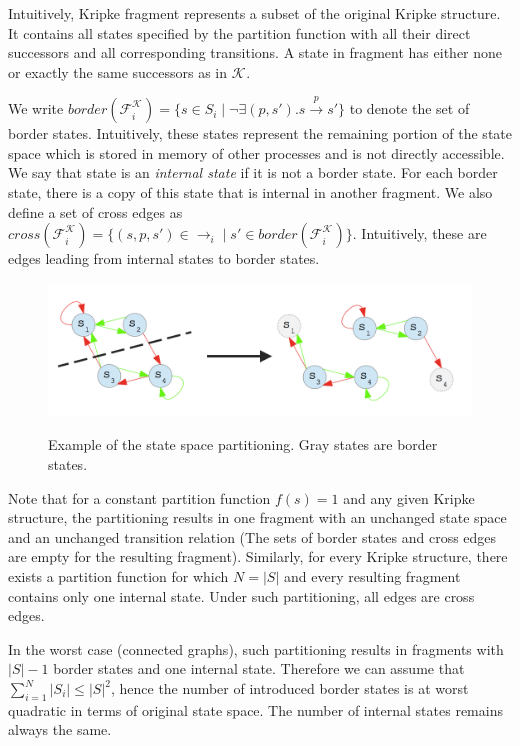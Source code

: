 \documentclass[12pt,oneside]{fithesis2}
\newcommand{\ks}[1][]{\ensuremath{\mathcal{K}_{#1}}}
\newcommand{\kf}[2]{\ensuremath{\mathcal{F}^{#2}_{#1}}}
\newcommand{\trans}[1]{\stackrel{#1}{\rightarrow}}
\begin{document}
			Intuitively, Kripke fragment represents a subset of the original Kripke structure. It contains all states specified by the partition function with all their direct successors and all corresponding transitions. A state in fragment has either none or exactly the same successors as in $\ks$.
			
			We write $border(\kf{i}{\ks}) =  \{ s\in S_i \mid \neg \exists (p,s').s\trans{p}s'\}$ to denote the set of border states. Intuitively, these states represent the remaining portion of the state space which is stored in memory of other processes and is not directly accessible. We say that state is an \emph{internal state} if it is not a border state. For each border state, there is a copy of this state that is internal in another fragment. We also define a set of cross edges as $cross(\kf{i}{\ks}) = \{ (s, p, s') \in \trans{}_{i} \mid s' \in border(\kf{i}{\ks}) \}$. Intuitively, these are edges leading from internal states to border states. 
			
			\begin{figure}
			  \begin{center}
				 \includegraphics[scale=.3]{partition.png}
				\label{fig:genmodel}
				\caption{Example of the state space partitioning. Gray states are border states. }
				\end{center}
			\end{figure}


			Note that for a constant partition function $f(s) = 1$ and any given Kripke structure, the partitioning results in one fragment with an unchanged state space and an unchanged transition relation (The sets of border states and cross edges are empty for the resulting fragment). Similarly, for every Kripke structure, there exists a partition function for which $N = |S|$ and every resulting fragment contains only one internal state. Under such partitioning, all edges are cross edges. 
			
			In the worst case (connected graphs), such partitioning results in fragments with $|S| - 1$ border states and one internal state. Therefore we can assume that $\sum\limits_{i=1}^N | S_i | \leq |S|^2 $, hence the number of introduced border states is at worst quadratic in terms of original state space. The number of internal states remains always the same.
\end{document}
